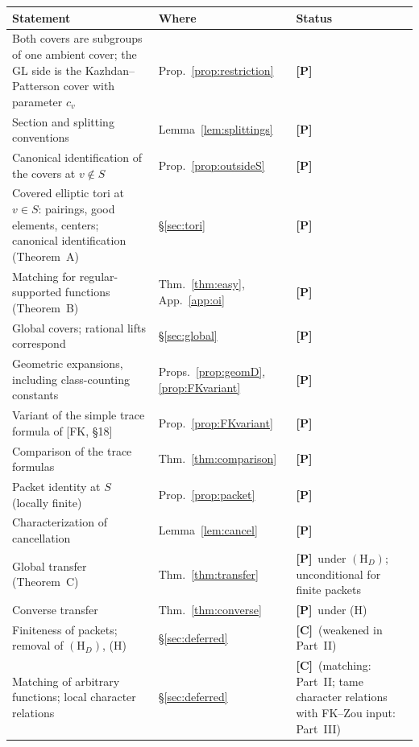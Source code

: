 \documentclass[12pt]{article}
\newcommand{\GL}{\mathrm{GL}}
\newcommand{\Pv}{\textbf{[P]}}
\newcommand{\Cv}{\textbf{[C]}}
\theoremstyle{plain}
\theoremstyle{definition}
\begin{document}
\begin{center}
\begin{tabular}{>{\raggedright\arraybackslash}p{}>{\raggedright\arraybackslash}p{}>{\raggedright\arraybackslash}p{}}
\toprule
Statement & Where & Status\\
\midrule
Both covers are subgroups of one ambient cover; the $\GL$ side is the Kazhdan--Patterson cover with parameter $c_v$ & Prop.~\ref{prop:restriction} & \Pv\\
Section and splitting conventions & Lemma~\ref{lem:splittings} & \Pv\\
Canonical identification of the covers at $v\notin S$ & Prop.~\ref{prop:outsideS} & \Pv\\
Covered elliptic tori at $v\in S$: pairings, good elements, centers; canonical identification (Theorem~A) & \S\ref{sec:tori} & \Pv\\
Matching for regular-supported functions (Theorem~B) & Thm.~\ref{thm:easy}, App.~\ref{app:oi} & \Pv\\
Global covers; rational lifts correspond & \S\ref{sec:global} & \Pv\\
Geometric expansions, including class-counting constants & Props.~\ref{prop:geomD}, \ref{prop:FKvariant} & \Pv\\
Variant of the simple trace formula of [FK, \S18] & Prop.~\ref{prop:FKvariant} & \Pv\\
Comparison of the trace formulas & Thm.~\ref{thm:comparison} & \Pv\\
Packet identity at $S$ (locally finite) & Prop.~\ref{prop:packet} & \Pv\\
Characterization of cancellation & Lemma~\ref{lem:cancel} & \Pv\\
Global transfer (Theorem~C) & Thm.~\ref{thm:transfer} & \Pv\ under $(\mathrm H_D)$; unconditional for finite packets\\
Converse transfer & Thm.~\ref{thm:converse} & \Pv\ under (H)\\
Finiteness of packets; removal of $(\mathrm H_D)$, (H) & \S\ref{sec:deferred} & \Cv\ (weakened in Part~II)\\
Matching of arbitrary functions; local character relations & \S\ref{sec:deferred} & \Cv\ (matching: Part~II; tame character relations with FK--Zou input: Part~III)\\
\bottomrule
\end{tabular}
\end{center}
\end{document}
